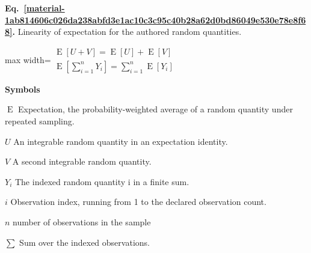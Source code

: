 \documentclass[11pt,a4paper]{article}
\begin{document}
\par\medskip
\noindent\begin{minipage}{\linewidth}
\label{material-1ab814606c026da238abfd3e1ac10c3c95c40b28a62d0bd86049e530e78e8f68}
\noindent\textbf{Eq.~\ref*{material-1ab814606c026da238abfd3e1ac10c3c95c40b28a62d0bd86049e530e78e8f68}.} Linearity of expectation for the authored random quantities.\par\nopagebreak
\begin{center}\begin{adjustbox}{max width=\linewidth}$\displaystyle \begin{gathered}\operatorname{E}[U+V]=\operatorname{E}[U]+\operatorname{E}[V]\\\operatorname{E}[{\textstyle\sum_{i=1}^n}Y_i]={\textstyle\sum_{i=1}^n}\operatorname{E}[Y_i]\end{gathered}$\end{adjustbox}\end{center}

\par\noindent\textbf{Symbols}

\par\noindent\textbf{\(\operatorname{E}\)} Expectation, the probability-weighted average of a random quantity under repeated sampling.

\par\noindent\textbf{\(U\)} An integrable random quantity in an expectation identity.

\par\noindent\textbf{\(V\)} A second integrable random quantity.

\par\noindent\textbf{\(Y_i\)} The indexed random quantity i in a finite sum.

\par\noindent\textbf{\(i\)} Observation index, running from 1 to the declared observation count.

\par\noindent\textbf{\(n\)} number of observations in the sample

\par\noindent\textbf{\(\sum\)} Sum over the indexed observations.

\end{minipage}\par
\medskip
\end{document}
